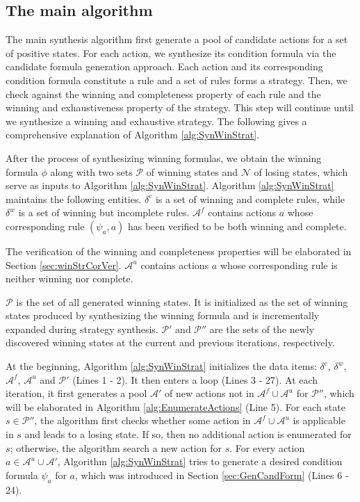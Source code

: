 \documentclass[review]{elsarticle}
\newcommand{\positiveSet}{\mathcal{P}}
\newcommand{\negativeSet}{\mathcal{N}}
\newcommand{\act}{\mathcal{A}}
\begin{document}
\subsection{The main algorithm}
The main synthesis algorithm first generate a pool of candidate actions for a set of positive states.
For each action, we synthesize its condition formula via the candidate formula generation approach.
Each action and its corresponding condition formula constitute a rule and a set of rules forms a strategy.
Then, we check against the winning and completeness property of each rule and the winning and exhaustiveness property of the strategy.
This step will continue until we synthesize a winning and exhaustive strategy. %
The following gives a comprehensive explanation of Algorithm \ref{alg:SynWinStrat}.

After the process of synthesizing winning formulas, we obtain the winning formula $\phi$ along with two sets $\positiveSet$ of winning states and $\negativeSet$ of losing states, which serve as inputs to Algorithm \ref{alg:SynWinStrat}.
Algorithm \ref{alg:SynWinStrat} maintains the following entities.
$\delta^c$ is a set of winning and complete rules, while $\delta^w$ is a set of winning but incomplete rules.
$\act^f$ contains actions $a$ whose corresponding rule $(\psi_a, a)$ has been verified to be both winning and complete. %


The verification of the winning and completeness properties will be elaborated in Section \ref{sec:winStrCorVer}.
$\act^u$ contains actions $a$ whose corresponding rule is neither winning nor complete. 

$\positiveSet$ is the set of all generated winning states.
It is initialized as the set of winning states produced by synthesizing the winning formula and is incrementally expanded during strategy synthesis.
$\positiveSet'$ and $\positiveSet''$ are the sets of the newly discovered winning states at the current and previous iterations, respectively.


At the beginning, Algorithm \ref{alg:SynWinStrat} initializes the data items: $\delta^c$, $\delta^w$, $\act^f$, $\act^u$ and $\positiveSet'$ (Lines 1 - 2).
It then enters a loop (Lines 3 - 27).
At each iteration, it first generates a pool $\act'$ of new actions not in $\act^f \cup \act^u$ for $\positiveSet''$, which will be elaborated in Algorithm \ref{alg:EnumerateActions}  (Line 5).
For each state $s \in \positiveSet''$, the algorithm first checks whether some action in $\act^f \cup \act^u$ is applicable in $s$ and leads to a losing state.
If so, then no additional action is enumerated for $s$; otherwise, the algorithm search a new action for $s$.
For every action $a \in \act^u \cup \act'$, Algorithm \ref{alg:SynWinStrat} tries to generate a desired condition formula $\psi_a$ for $a$, which was introduced in Section \ref{sec:GenCandForm} (Lines 6 - 24).
\end{document}
